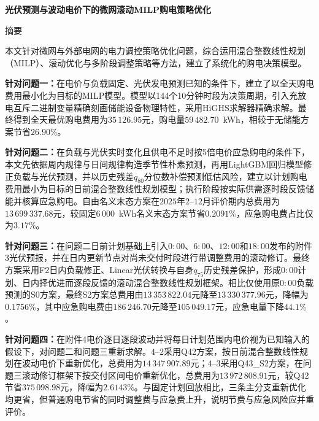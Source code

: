\documentclass[12pt,a4paper]{ctexart}
\theoremstyle{definition}
\theoremstyle{plain}
\theoremstyle{remark}
\renewenvironment{abstract}
  {\begin{center}\heiti\zihao{-3}摘\quad 要\end{center}\zihao{-4}\songti\indent}
  {\par\vspace{1em}}
\begin{document}
\pagestyle{plain}

\begin{center}
{\heiti\bfseries 光伏预测与波动电价下的微网滚动MILP购电策略优化}
\end{center}
\vspace{1em}

\setcounter{page}{1}

\begin{abstract}
本文针对微网与外部电网的电力调控策略优化问题，综合运用混合整数线性规划（MILP）、滚动优化与多阶段调整策略等方法，建立了系统化的购电决策模型。

\textbf{针对问题一：}在电价与负载固定、光伏发电预测已知的条件下，建立了以全天购电费用最小化为目标的MILP模型。模型以144个10分钟时段为决策周期，引入充放电互斥二进制变量精确刻画储能设备物理特性，采用HiGHS求解器精确求解。最终得到全天最优购电费用为$35\,126.95$元，购电量$59\,482.70$~kWh，相较于无储能方案节省$26.90\%$。

\textbf{针对问题二：}在负载与光伏实时变化且供电不足时按5倍电价应急购电的条件下，本文先依据周内规律与日间规律构造季节性朴素预测，再用LightGBM回归模型修正负载与光伏预测，并以历史残差$q_{80}$分位数补偿预测低估风险，建立以计划购电费用最小为目标的日前混合整数线性规划模型；执行阶段按实际供需逐时段反馈储能并核算应急购电。自由名义末态方案在$2025$年$2$--$12$月评价期内总费用为$13\,699\,337.68$元，较固定$6\,000$~kWh名义末态方案节省$0.2091\%$，应急购电费占比仅为$3.17\%$。

\textbf{针对问题三：}在问题二日前计划基础上引入$0{:}00$、$6{:}00$、$12{:}00$和$18{:}00$发布的附件3光伏预报，并在日内更新节点对尚未交付时段进行带调整费用的滚动修订。最终方案采用F2日内负载修正、Linear光伏转换与自身$q_{75}$历史残差保护，形成$0{:}00$计划、日内择优进而逐段反馈的滚动混合整数线性规划框架。相比仅使用原$0{:}00$负载预测的S0方案，最终S2方案总费用由$13\,353\,822.04$元降至$13\,330\,377.96$元，降幅为$0.1756\%$，其中应急购电费由$186\,246.70$元降至$105\,049.17$元，应急电量下降$44.1\%$。

\textbf{针对问题四：}在附件4电价逐日逐段波动并将每日计划范围内电价视为已知输入的假设下，对问题二和问题三重新求解。$4$--$2$采用Q42方案，按日前混合整数线性规划在波动电价下重新优化，总费用为$14\,347\,907.89$元；$4$--$3$采用Q43\_S2方案，在问题三滚动修订框架下按交付区间电价重新优化，总费用为$13\,972\,808.91$元，较Q42节省$375\,098.98$元，降幅为$2.6143\%$。与固定计划回放相比，三条主分支重新优化均更省，但普通购电节省的同时调整费与应急费上升，说明节费与应急风险应并重评价。
\end{abstract}
\end{document}
